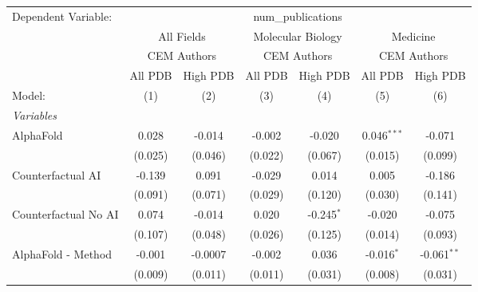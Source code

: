 \begingroup
\centering
\begin{tabular}{lcccccc}
   \tabularnewline \midrule \midrule
   Dependent Variable: & \multicolumn{6}{c}{num\_publications}\\
 & \multicolumn{2}{c}{All Fields} & \multicolumn{2}{c}{Molecular Biology} & \multicolumn{2}{c}{Medicine} \\
\cmidrule(lr){2-3} \cmidrule(lr){4-5} \cmidrule(lr){6-7}
 & \multicolumn{2}{c}{CEM Authors} & \multicolumn{2}{c}{CEM Authors} & \multicolumn{2}{c}{CEM Authors} \\
\cmidrule(lr){2-3} \cmidrule(lr){4-5} \cmidrule(lr){6-7}
 & \multicolumn{1}{c}{All PDB} & \multicolumn{1}{c}{High PDB} & \multicolumn{1}{c}{All PDB} & \multicolumn{1}{c}{High PDB} & \multicolumn{1}{c}{All PDB} & \multicolumn{1}{c}{High PDB} \\
\cmidrule(lr){2-2} \cmidrule(lr){3-3} \cmidrule(lr){4-4} \cmidrule(lr){5-5} \cmidrule(lr){6-6} \cmidrule(lr){7-7}
   Model:                                                     & (1)         & (2)     & (3)           & (4)           & (5)           & (6)\\  
   \midrule
   \emph{Variables}\\
   AlphaFold                                                  & 0.028       & -0.014  & -0.002        & -0.020        & 0.046$^{***}$ & -0.071\\   
                                                              & (0.025)     & (0.046) & (0.022)       & (0.067)       & (0.015)       & (0.099)\\   
   Counterfactual AI                                          & -0.139      & 0.091   & -0.029        & 0.014         & 0.005         & -0.186\\   
                                                              & (0.091)     & (0.071) & (0.029)       & (0.120)       & (0.030)       & (0.141)\\   
   Counterfactual No AI                                       & 0.074       & -0.014  & 0.020         & -0.245$^{*}$  & -0.020        & -0.075\\   
                                                              & (0.107)     & (0.048) & (0.026)       & (0.125)       & (0.014)       & (0.093)\\   
   AlphaFold - Method                                         & -0.001      & -0.0007 & -0.002        & 0.036         & -0.016$^{*}$  & -0.061$^{**}$\\   
                                                              & (0.009)     & (0.011) & (0.011)       & (0.031)       & (0.008)       & (0.031)\\   

\end{tabular}
